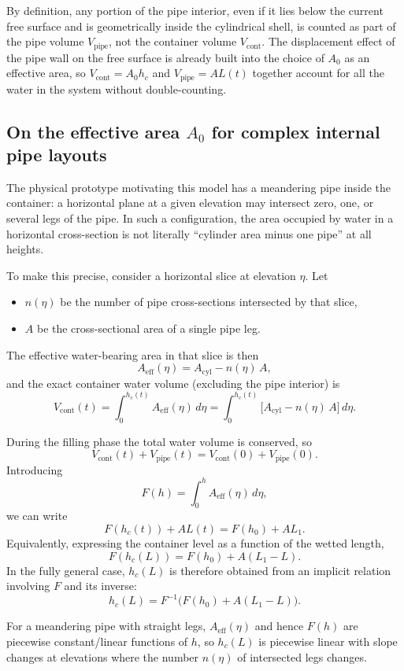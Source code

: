 \documentclass[11pt]{article}
\begin{document}
By definition, any portion of the pipe interior, even if it lies below the current free surface
and is geometrically inside the cylindrical shell, is counted as part of the pipe volume
$V_{\text{pipe}}$, not the container volume $V_{\text{cont}}$. The displacement effect of the
pipe wall on the free surface is already built into the choice of $A_0$ as an effective area,
so $V_{\text{cont}} = A_0 h_c$ and $V_{\text{pipe}} = A L(t)$ together account for all the
water in the system without double-counting.

\subsection{On the effective area $A_0$ for complex internal pipe layouts}

The physical prototype motivating this model has a meandering pipe inside the container: a
horizontal plane at a given elevation may intersect zero, one, or several legs of the pipe.
In such a configuration, the area occupied by water in a horizontal cross-section is not
literally ``cylinder area minus one pipe'' at all heights.

To make this precise, consider a horizontal slice at elevation $\eta$. Let
\begin{itemize}
  \item $n(\eta)$ be the number of pipe cross-sections intersected by that slice,
  \item $A$ be the cross-sectional area of a single pipe leg.
\end{itemize}
The effective water-bearing area in that slice is then
\[
  A_{\text{eff}}(\eta) = A_{\text{cyl}} - n(\eta)\,A,
\]
and the exact container water volume (excluding the pipe interior) is
\[
  V_{\text{cont}}(t)
  = \int_0^{h_c(t)} A_{\text{eff}}(\eta)\,d\eta
  = \int_0^{h_c(t)} \bigl[A_{\text{cyl}} - n(\eta)\,A\bigr]\,d\eta.
\]

During the filling phase the total water volume is conserved, so
\[
  V_{\text{cont}}(t) + V_{\text{pipe}}(t)
  = V_{\text{cont}}(0) + V_{\text{pipe}}(0).
\]
Introducing
\[
  F(h) = \int_0^{h} A_{\text{eff}}(\eta)\,d\eta,
\]
we can write
\[
  F(h_c(t)) + A L(t) = F(h_0) + A L_1.
\]
Equivalently, expressing the container level as a function of the wetted length,
\[
  F(h_c(L)) = F(h_0) + A (L_1 - L).
\]
In the fully general case, $h_c(L)$ is therefore obtained from an implicit relation involving
$F$ and its inverse:
\[
  h_c(L) = F^{-1}\Big(F(h_0) + A (L_1 - L)\Big).
\]

For a meandering pipe with straight legs, $A_{\text{eff}}(\eta)$ and hence $F(h)$ are piecewise
constant/linear functions of $h$, so $h_c(L)$ is piecewise linear with slope changes at
elevations where the number $n(\eta)$ of intersected legs changes.
\end{document}
